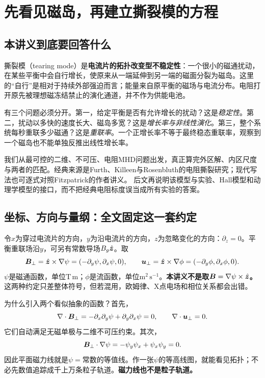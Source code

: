\chapter{先看见磁岛，再建立撕裂模的方程}\label{tm:foundations}
\section{本讲义到底要回答什么}
撕裂模（tearing mode）是\textbf{电流片的拓扑改变型不稳定性}：一个很小的磁通扰动，在某些平衡中会自行增长，使原来从一端延伸到另一端的磁面分裂为磁岛。这里的“自行”是相对于持续外部强迫而言；能量来自原平衡的磁场与电流分布。电阻打开原先被理想磁冻结禁止的演化通道，并不作为供能电池。

有三个问题必须分开。第一，给定平衡是否有允许增长的扰动？这是\emph{稳定性}。第二，扰动以多快的速度长大、磁岛多宽？这是\emph{增长率与非线性演化}。第三，整个系统每秒重联多少磁通？这是\emph{重联率}。一个正增长率不等于最终稳态重联率，观察到一个磁岛也不能单独反推出线性增长率。

我们从最可控的二维、不可压、电阻MHD问题出发，真正算完外区解、内区尺度与两者的匹配。经典来源是Furth、Killeen与Rosenbluth的电阻撕裂研究；现代写法也可逐式对照Fitzpatrick的作者讲义。\citep{TMFKR1963,TMFitzMatching} 后文再说明该模型与实验、Hall模型和动理学模型的接口，而不把经典电阻标度误当成所有实验的答案。

\section{坐标、方向与量纲：全文固定这一套约定}
令$x$为穿过电流片的方向，$y$为沿电流片的方向，$z$为忽略变化的方向：$\partial_z=0$。平衡重联场沿$y$，可另有常数导场$B_g\hat{\bm{z}}$。取
\begin{equation}
 \bm{B}_\perp=\hat{\bm{z}}\times\nabla\psi
 =(-\partial_y\psi,\partial_x\psi,0),\qquad
 \bm{u}_\perp=\hat{\bm{z}}\times\nabla\phi
 =(-\partial_y\phi,\partial_x\phi,0).
 \label{tm:fluxstream}
\end{equation}
$\psi$是磁通函数，单位$\mathrm{T\,m}$；$\phi$是流函数，单位$\mathrm{m^2\,s^{-1}}$。\textbf{本讲义不是取$\bm{B}=\nabla\psi\times\hat{\bm{z}}$。}这两种约定只差整体符号，但若混用，欧姆律、X点电场和相位关系都会出错。

为什么引入两个看似抽象的函数？首先，
\begin{equation}
 \nabla\cdot\bm{B}_\perp=-\partial_x\partial_y\psi+\partial_y\partial_x\psi=0,
 \qquad \nabla\cdot\bm{u}_\perp=0.
\end{equation}
它们自动满足无磁单极与二维不可压约束。其次，
\begin{equation}
 \bm{B}_\perp\cdot\nabla\psi
 =-\psi_y\psi_x+\psi_x\psi_y=0.
\end{equation}
因此平面磁力线就是$\psi=\text{常数}$的等值线。作一张$\psi$的等高线图，就能看见拓扑；不必先数值追踪成千上万条粒子轨道。\textbf{磁力线也不是粒子轨道。}

